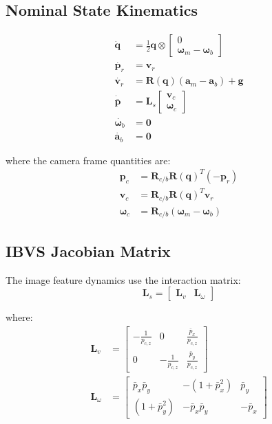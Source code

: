 \documentclass[11pt,a4paper]{article}
\newcommand{\quat}{\mathbf{q}}
\newcommand{\pr}{\mathbf{p}_r}
\newcommand{\vr}{\mathbf{v}_r}
\newcommand{\pbar}{\bar{\mathbf{p}}}
\newcommand{\bgyr}{\bm{\omega}_b}
\newcommand{\bacc}{\mathbf{a}_b}
\newcommand{\R}{\mathbf{R}}
\begin{document}
\subsection{Nominal State Kinematics}
\begin{align}
    \dot{\quat} &= \frac{1}{2} \quat \otimes \begin{bmatrix} 0 \\ \bm{\omega}_m - \bgyr \end{bmatrix} \\[8pt]
    \dot{\pr} &= \vr \\[8pt]
    \dot{\vr} &= \R(\quat)(\mathbf{a}_m - \bacc) + \mathbf{g} \\[8pt]
    \dot{\pbar} &= \mathbf{L}_s \begin{bmatrix} \mathbf{v}_c \\ \bm{\omega}_c \end{bmatrix} \\[8pt]
    \dot{\bgyr} &= \mathbf{0} \\[8pt]
    \dot{\bacc} &= \mathbf{0}
\end{align}

where the camera frame quantities are:
\begin{align}
    \mathbf{p}_c &= \R_{c/b} \R(\quat)^T (-\pr) \\
    \mathbf{v}_c &= \R_{c/b} \R(\quat)^T \vr \\
    \bm{\omega}_c &= \R_{c/b} (\bm{\omega}_m - \bgyr)
\end{align}

\subsection{IBVS Jacobian Matrix}
The image feature dynamics use the interaction matrix:
\begin{equation}
    \mathbf{L}_s = \begin{bmatrix} \mathbf{L}_v & \mathbf{L}_\omega \end{bmatrix}
\end{equation}

where:
\begin{align}
    \mathbf{L}_v &= \begin{bmatrix}
        -\frac{1}{p_{c,z}} & 0 & \frac{\bar{p}_x}{p_{c,z}} \\[4pt]
        0 & -\frac{1}{p_{c,z}} & \frac{\bar{p}_y}{p_{c,z}}
    \end{bmatrix} \\[10pt]
    \mathbf{L}_\omega &= \begin{bmatrix}
        \bar{p}_x \bar{p}_y & -(1+\bar{p}_x^2) & \bar{p}_y \\[4pt]
        (1+\bar{p}_y^2) & -\bar{p}_x \bar{p}_y & -\bar{p}_x
    \end{bmatrix}
\end{align}
\end{document}
